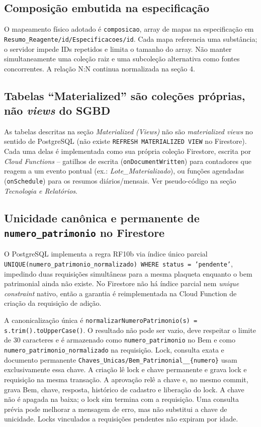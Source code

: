 \subsection{Composição embutida na especificação}
O mapeamento físico adotado é \texttt{composicao}, array de mapas na especificação em \texttt{Resumo\_Reagente/id/Especificacoes/id}. Cada mapa referencia uma substância; o servidor impede IDs repetidos e limita o tamanho do array. Não manter simultaneamente uma coleção raiz e uma subcoleção alternativa como fontes concorrentes. A relação N:N continua normalizada na seção 4.

\subsection{Tabelas ``Materialized'' são coleções próprias, não \textit{views} do SGBD}
As tabelas descritas na seção \textit{Materialized (Views)} não são \textit{materialized views} no sentido de PostgreSQL (não existe \texttt{REFRESH MATERIALIZED VIEW} no Firestore). Cada uma delas é implementada como sua própria coleção Firestore, escrita por \textit{Cloud Functions} -- gatilhos de escrita (\texttt{onDocumentWritten}) para contadores que reagem a um evento pontual (ex.: \textit{Lote\_Materializado}), ou funções agendadas (\texttt{onSchedule}) para os resumos diários/mensais. Ver pseudo-código na seção \textit{Tecnologia e Relatórios}.

\subsection{Unicidade canônica e permanente de \texttt{numero\_patrimonio} no Firestore}
O PostgreSQL implementa a regra RF10b via índice único parcial
\texttt{UNIQUE(numero\_patrimonio\_normalizado) WHERE status = 'pendente'},
impedindo duas requisições simultâneas para a mesma plaqueta enquanto
o bem patrimonial ainda não existe. No Firestore não há índice parcial
nem \emph{unique constraint} nativo, então a garantia é reimplementada
na Cloud Function de criação da requisição de adição.

A canonicalização única é \texttt{normalizarNumeroPatrimonio(s) =
s.trim().toUpperCase()}. O resultado não pode ser vazio, deve respeitar o limite
de 30 caracteres e é armazenado como \texttt{numero\_patrimonio} no Bem e como
\texttt{numero\_patrimonio\_normalizado} na requisição. Lock, consulta exata e
documento permanente \texttt{Chaves\_Unicas/Bem\_Patrimonial\_\_\{numero\}} usam
exclusivamente essa chave. A criação lê lock e chave permanente e grava lock e
requisição na mesma transação. A aprovação relê a chave e, no mesmo commit,
grava Bem, chave, resposta, histórico de cadastro e liberação do lock. A chave
não é apagada na baixa; o lock sim termina com a requisição. Uma consulta prévia
pode melhorar a mensagem de erro, mas não substitui a chave de unicidade. Locks
vinculados a requisições pendentes não expiram por idade.

